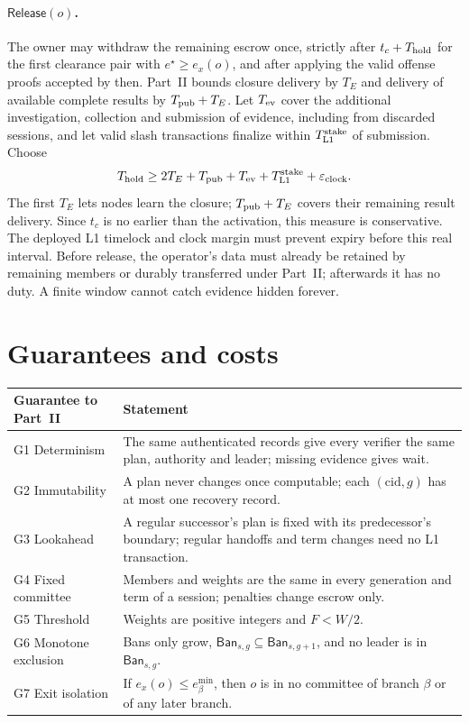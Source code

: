 \documentclass[11pt,a4paper]{article}
\newcommand{\tagg}[1]{\mathsf{#1}}
\newcommand{\Ban}{\mathsf{Ban}}
\newcommand{\emin}{e^{\min}}
\newcommand{\cid}{\mathrm{cid}}
\begin{document}
\paragraph{$\tagg{Release}(o)$.} The owner may withdraw the remaining
escrow once, strictly after $t_c+T_{\rm hold}$ for the first clearance pair
with $e^\star\ge e_x(o)$, and after applying the valid offense proofs
accepted by then. Part~II bounds closure delivery by $T_E$ and delivery of
available complete results by $T_{\rm pub}+T_E$. Let $T_{\rm ev}$ cover the
additional investigation, collection and submission of evidence,
including from discarded sessions, and let valid slash transactions
finalize within $T_{\rm L1}^{\rm stake}$ of submission. Choose
\begin{equation}\label{eq:hold}
 T_{\rm hold}\ge 2T_E+T_{\rm pub}+T_{\rm ev}+T_{\rm L1}^{\rm stake}
 +\varepsilon_{\rm clock}.
\end{equation}
The first $T_E$ lets nodes learn the closure; $T_{\rm pub}+T_E$ covers
their remaining result delivery. Since $t_c$ is no earlier than the
activation, this measure is conservative. The deployed L1 timelock and
clock margin must prevent expiry before this real interval. Before
release, the operator's data must already be retained by remaining
members or durably transferred under Part~II; afterwards it has no duty.
A finite window cannot catch evidence hidden forever.

\section{Guarantees and costs}
\label{sec:guarantees}
\begin{tabularx}{\linewidth}{@{}>{\raggedright\arraybackslash}p{.24\linewidth}Y@{}}\toprule
Guarantee to Part~II & Statement\\\midrule
G1 Determinism & The same authenticated records give every verifier the
same plan, authority and leader; missing evidence gives wait.\\
G2 Immutability & A plan never changes once computable; each
$(\cid,g)$ has at most one recovery record.\\
G3 Lookahead & A regular successor's plan is fixed with its predecessor's
boundary; regular handoffs and term changes need no L1 transaction.\\
G4 Fixed committee & Members and weights are the same in every generation
and term of a session; penalties change escrow only.\\
G5 Threshold & Weights are positive integers and $F<W/2$.\\
G6 Monotone exclusion & Bans only grow, $\Ban_{s,g}\subseteq\Ban_{s,g+1}$,
and no leader is in $\Ban_{s,g}$.\\
G7 Exit isolation & If $e_x(o)\le\emin_\beta$, then $o$ is in no committee
of branch $\beta$ or of any later branch.\\\bottomrule
\end{tabularx}
\end{document}
